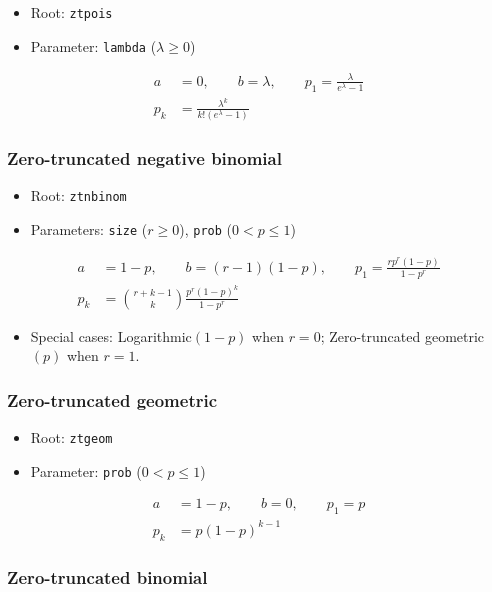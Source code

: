 \documentclass[x11names]{article}
\newcommand{\code}[1]{\texttt{#1}}
\begin{document}
\begin{itemize}
\item Root: \code{ztpois}
\item Parameter: \code{lambda} ($\lambda \geq 0$)
\end{itemize}
\begin{align*}
  a &= 0, \qquad b = \lambda, \qquad
      p_1 = \frac{\lambda}{e^\lambda - 1} \\
  p_k &= \frac{\lambda^k}{k! (e^\lambda - 1)}
\end{align*}

\subsubsection{Zero-truncated negative binomial}

\begin{itemize}
\item Root: \code{ztnbinom}
\item Parameters: \code{size} ($r \geq 0$),
  \code{prob} ($0 < p \leq 1$)
\end{itemize}
\begin{align*}
  a &= 1 - p, \qquad b = (r - 1)(1 - p), \qquad
      p_1 = \frac{r p^r (1 - p)}{1 - p^r} \\
  p_k &= \binom{r+k-1}{k} \frac{p^r (1 - p)^k}{1 - p^r}
\end{align*}

\begin{itemize}
\item Special cases:  Logarithmic$(1 - p)$ when $r = 0$;
  Zero-truncated geometric$(p)$ when $r = 1$.
\end{itemize}

\subsubsection{Zero-truncated geometric}

\begin{itemize}
\item Root: \code{ztgeom}
\item Parameter: \code{prob} ($0 < p \leq 1$)
\end{itemize}
\begin{align*}
  a &= 1 - p, \qquad b = 0, \qquad p_1 = p \\
  p_k &= p (1 - p)^{k - 1}
\end{align*}

\subsubsection{Zero-truncated binomial}
\end{document}
